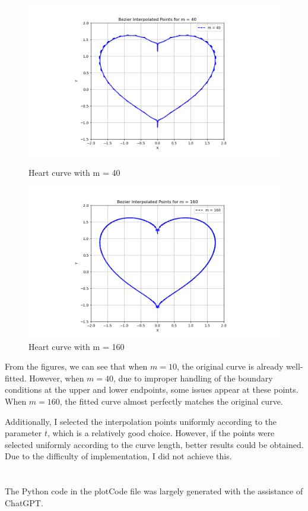 \documentclass[a4paper]{article}
\begin{document}
\begin{figure}[ht]
\begin{minipage}[b]{0.45\textwidth}
    \centering
    \includegraphics[width=\textwidth]{figures/bezier2.png}
    \caption{Heart curve with m = 40}
    \label{fig:bezierm40}
  \end{minipage}
  \hfill
  \begin{minipage}[b]{0.45\textwidth}
    \centering
    \includegraphics[width=\textwidth]{figures/bezier3.png}
    \caption{Heart curve with m = 160}
    \label{fig:bezierm160}
  \end{minipage}
\end{figure}

From the figures, we can see that when \( m = 10 \), the original curve is already well-fitted. However, when \( m = 40 \), due to improper handling of the boundary conditions at the upper and lower endpoints, some issues appear at these points. When \( m = 160 \), the fitted curve almost perfectly matches the original curve.

Additionally, I selected the interpolation points uniformly according to the parameter \( t \), which is a relatively good choice. However, if the points were selected uniformly according to the curve length, better results could be obtained. Due to the difficulty of implementation, I did not achieve this.
\section*{  }
The Python code in the plotCode file was largely generated with the assistance of ChatGPT.
\end{document}
